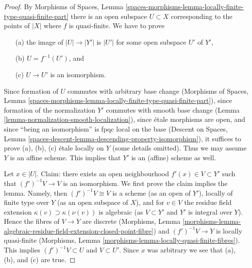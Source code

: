 \begin{proof}
By Morphisms of Spaces, Lemma
\ref{spaces-morphisms-lemma-locally-finite-type-quasi-finite-part}
there is an open subspace $U \subset X$ corresponding to the points
of $|X|$ where $f$ is quasi-finite. We have to prove
\begin{enumerate}
\item[(a)] the image of $|U| \to |Y'|$ is $|U'|$ for some open subspace
$U'$ of $Y'$,
\item[(b)] $U = f^{-1}(U')$, and
\item[(c)] $U \to U'$ is an isomorphism.
\end{enumerate}
Since formation of $U$ commutes with arbitrary base change
(Morphisms of Spaces, Lemma
\ref{spaces-morphisms-lemma-locally-finite-type-quasi-finite-part}),
since formation of the normalization $Y'$ commutes with smooth
base change (Lemma \ref{lemma-normalization-smooth-localization}),
since \'etale morphisms are open, and
since ``being an isomorphism'' is fpqc local on the base
(Descent on Spaces, Lemma
\ref{spaces-descent-lemma-descending-property-isomorphism}),
it suffices to prove (a), (b), (c) \'etale locally on $Y$
(some details omitted). Thus
we may assume $Y$ is an affine scheme. This implies that $Y'$ is
an (affine) scheme as well.

\medskip\noindent
Let $x \in |U|$. Claim: there exists an open
neighbourhood $f'(x) \in V \subset Y'$ such that $(f')^{-1}V \to V$ is an
isomorphism. We first prove the claim implies the lemma.
Namely, then $(f')^{-1}V \cong V$ is a scheme (as an open
of $Y'$), locally of finite type over $Y$ (as an open subspace of $X$),
and for $v \in V$ the residue field extension
$\kappa(v) \supset \kappa(\nu(v))$ is algebraic (as
$V \subset Y'$ and $Y'$ is integral over $Y$). Hence the fibres
of $V \to Y$ are discrete (Morphisms, Lemma
\ref{morphisms-lemma-algebraic-residue-field-extension-closed-point-fibre})
and $(f')^{-1}V \to Y$ is locally quasi-finite
(Morphisms, Lemma \ref{morphisms-lemma-locally-quasi-finite-fibres}).
This implies $(f')^{-1}V \subset U$ and $V \subset U'$. Since $x$ was
arbitrary we see that (a), (b), and (c) are true.


\end{proof}
